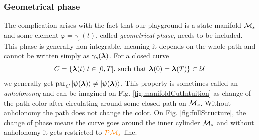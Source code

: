 \subsubsection{Geometrical phase}
The complication arises with the fact that our playground is a state manifold $\mathcal{M}_s$ and some element $\varphi=\gamma_s(t)$, called \emph{geometrical phase}, needs to be included. This phase is generally non-integrable, meaning it depends on the whole path and cannot be written simply as $\gamma_s({\bm\lambda})$. For a closed curve
\begin{equation}
    C=\{{\bm\lambda}(t)|t\in[0,T] \text{, such that }{\bm\lambda}(0)={\bm\lambda}(T)\}\subset \mathcal U
\end{equation} 
we generally get $\textrm{par}_C \ket{\psi({\bm\lambda})}\neq \ket{\psi({\bm\lambda})}$. This property is sometimes called an \emph{anholonomy} and can be imagined on Fig. \ref{fig:manifoldCutIntuition} as change of the path color after circulating around some closed path on $\mathcal{M}_s$. Without anholonomy the path does not change the color. On Fig. \ref{fig:fullStructure}, the change of phase means the curve goes around the inner cylinder $\mathcal{M}_s$ and without anholonomy it gets restricted to $\textcolor{orange}{\mathcal{P}\mathcal{M}_s}$ line.



